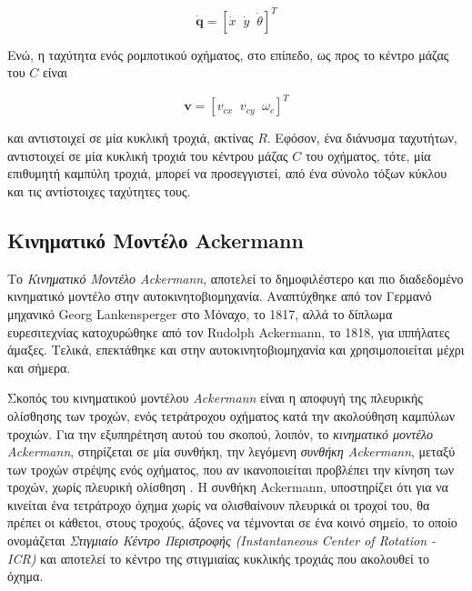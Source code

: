 \begin{equation}
	\dot{\mathbf{q}} = [\dot x\;\; \dot y\;\; \dot \theta]^T
	\label{eq:dpose}
\end{equation}

\bigskip
\noindent
Ενώ, η ταχύτητα ενός ρομποτικού οχήματος, στο επίπεδο, ως προς το κέντρο μάζας του $C$ είναι

\begin{equation}
	 \textbf{v} = [v_{cx}\;\; v_{cy}\;\; \omega_c]^T
	\label{eq:speed}
\end{equation}

\bigskip
\noindent
και αντιστοιχεί σε μία κυκλική τροχιά, ακτίνας $R$. Εφόσον, ένα διάνυσμα ταχυτήτων, αντιστοιχεί σε μία κυκλική τροχιά του κέντρου μάζας $C$ του οχήματος, τότε, μία επιθυμητή καμπύλη τροχιά, μπορεί να προσεγγιστεί, από ένα σύνολο τόξων κύκλου και τις αντίστοιχες  ταχύτητες τους.


\bigskip
\subsection{Κινηματικό Μοντέλο Ackermann} \label{ssec:ackermann_kinematics}
Το \textit{Κινηματικό Μοντέλο Ackermann}, αποτελεί το δημοφιλέστερο και πιο διαδεδομένο κινηματικό μοντέλο στην αυτοκινητοβιομηχανία. Αναπτύχθηκε από τον Γερμανό μηχανικό Georg Lankensperger στο Μόναχο, το 1817, αλλά το δίπλωμα ευρεσιτεχνίας κατοχυρώθηκε από τον Rudolph Ackermann, το 1818, για ιππήλατες άμαξες. Τελικά, επεκτάθηκε και στην αυτοκινητοβιομηχανία και χρησιμοποιείται μέχρι και σήμερα.

\bigskip 
Σκοπός του κινηματικού μοντέλου \textit{Ackermann} είναι η αποφυγή της πλευρικής ολίσθησης των τροχών, ενός τετράτροχου οχήματος κατά την ακολούθηση καμπύλων τροχιών. Για την εξυπηρέτηση αυτού του σκοπού, λοιπόν, το \textit{κινηματικό μοντέλο Ackermann}, στηρίζεται σε μία συνθήκη, την λεγόμενη \textit{συνθήκη Ackermann}, μεταξύ των τροχών στρέψης ενός οχήματος, που αν ικανοποιείται προβλέπει την κίνηση των τροχών, χωρίς πλευρική ολίσθηση \cite{vehicle_dynamics}. Η συνθήκη Ackermann, υποστηρίζει ότι για να κινείται ένα τετράτροχο όχημα χωρίς να ολισθαίνουν πλευρικά οι τροχοί του, θα πρέπει οι κάθετοι, στους τροχούς, άξονες να τέμνονται σε ένα κοινό σημείο, το οποίο ονομάζεται \textit{Στιγμιαίο Κέντρο Περιστροφής (Instantaneous Center of Rotation - ICR)} \cite{4ws_kinematics} και αποτελεί το κέντρο της στιγμιαίας κυκλικής τροχιάς που ακολουθεί το όχημα.

